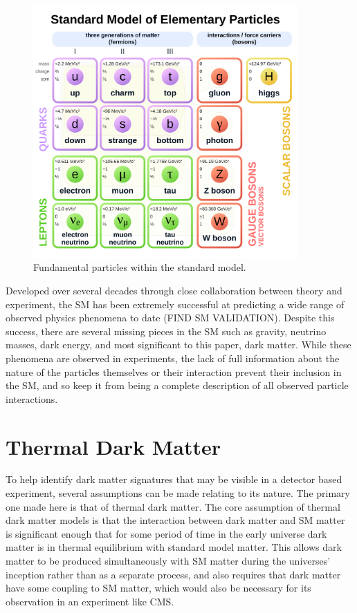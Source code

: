\begin{figure}
	\includegraphics[width=0.9\textwidth]{figures/smParticles.svg}
	\centering
	\caption{Fundamental particles within the standard model.}
	\label{fig:SM}
\end{figure}

Developed over several decades through close collaboration between theory and experiment, the SM has been extremely successful at predicting a wide range of observed physics phenomena to date (FIND SM VALIDATION).
Despite this success, there are several missing pieces in the SM such as gravity, neutrino masses, dark energy, and most significant to this paper, dark matter.
While these phenomena are observed in experiments, the lack of full information about the nature of the particles themselves or their interaction prevent their inclusion in the SM, and so keep it from being a complete description of all observed particle interactions.  

\section{Thermal Dark Matter}
To help identify dark matter signatures that may be visible in a detector based experiment, several assumptions can be made relating to its nature. 
The primary one made here is that of thermal dark matter.
The core assumption of thermal dark matter models is that the interaction between dark matter and SM matter is significant enough that for some period of time in the early universe dark matter is in thermal equilibrium with standard model matter.
This allows dark matter to be produced simultaneously with SM matter during the universes' inception rather than as a separate process, and also requires that dark matter have some coupling to SM matter, which would also be necessary for its observation in an experiment like CMS.

